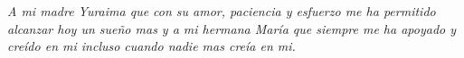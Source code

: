 \documentclass[letterpaper,titlepage,12pt,oneside,spanish,final]{report_eie}
\numberwithin{equation}{chapter}%
\numberwithin{figure}{chapter}%
\numberwithin{table}{chapter}%
\numberwithin{definition}{chapter}%
\numberwithin{lemma}{chapter}%
\numberwithin{theorem}{chapter}%
\numberwithin{corollary}{chapter}%
\numberwithin{condition}{chapter}%
\numberwithin{criterion}{chapter}%
\numberwithin{problem}{chapter}%
\numberwithin{property}{chapter}%
\numberwithin{proposition}{chapter}%
\numberwithin{solution}{chapter}%
\numberwithin{conjecture}{chapter}%
\begin{document}



\begin{figure}
        \begin{center}

        \vspace{0.5mm}
        \label{Fig.aprobacion}
        \end{center}
        \end{figure}
\thispagestyle{empty}
\newpage

\begin{figure}
        \begin{center}
        \vspace{0.5mm}
        \label{Fig.mencion}
        \end{center}
\end{figure}
\thispagestyle{empty}
\newpage%
\newenvironment{dedication}%
{\cleardoublepage \thispagestyle{empty} %
\begin{center} \em} {\end{center} \vspace*{\stretch{3}} }%
\begin{dedication}%
A mi madre Yuraima que con su amor, paciencia y esfuerzo me ha permitido alcanzar hoy un sueño mas y a mi hermana María que siempre me ha apoyado y creído en mi incluso cuando nadie mas creía en mi.
\end{dedication}%
\newpage
\end{document}
